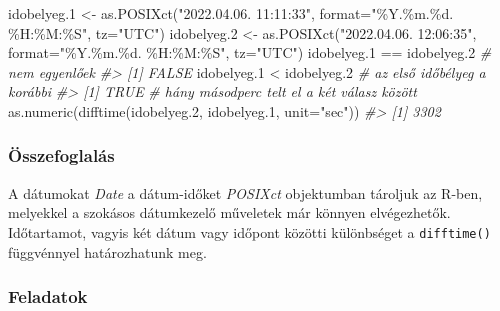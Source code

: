 \documentclass[
]{book}
\makeatletter
\newenvironment{Shaded}{\begin{snugshade}}{\end{snugshade}}
\newcommand{\AttributeTok}[1]{\textcolor[rgb]{0.77,0.63,0.00}{#1}}
\newcommand{\CommentTok}[1]{\textcolor[rgb]{0.56,0.35,0.01}{\textit{#1}}}
\newcommand{\FloatTok}[1]{\textcolor[rgb]{0.00,0.00,0.81}{#1}}
\newcommand{\FunctionTok}[1]{\textcolor[rgb]{0.00,0.00,0.00}{#1}}
\newcommand{\NormalTok}[1]{#1}
\newcommand{\OtherTok}[1]{\textcolor[rgb]{0.56,0.35,0.01}{#1}}
\newcommand{\SpecialCharTok}[1]{\textcolor[rgb]{0.00,0.00,0.00}{#1}}
\newcommand{\StringTok}[1]{\textcolor[rgb]{0.31,0.60,0.02}{#1}}
\newenvironment{kframe}{%
\medskip{}
\setlength{\fboxsep}{.8em}
 \def\at@end@of@kframe{}%
 \ifinner\ifhmode%
  \def\at@end@of@kframe{\end{minipage}}%
  \begin{minipage}{\columnwidth}%
 \fi\fi%
 \def\FrameCommand##1{\hskip\@totalleftmargin \hskip-\fboxsep
 \colorbox{shadecolor}{##1}\hskip-\fboxsep
     \hskip-\linewidth \hskip-\@totalleftmargin \hskip\columnwidth}%
 \MakeFramed {\advance\hsize-\width
   \@totalleftmargin\z@ \linewidth\hsize
   \@setminipage}}%
 {\par\unskip\endMakeFramed%
 \at@end@of@kframe}
\newenvironment{rmdblock}[1]
  {
  \begin{itemize}
  \renewcommand{\labelitemi}{
    \raisebox{-.7\height}[0pt][0pt]{
      {\setkeys{Gin}{width=3em,keepaspectratio}\texttt{[image: images/\#1]}}
    }
  }
  \setlength{\fboxsep}{1em}
  \begin{kframe}
  \item
  }
  {
  \end{kframe}
  \end{itemize}
  }
\newenvironment{rmdsummary}
  {\begin{rmdblock}{summary}}
  {\end{rmdblock}}
\makeatother
\begin{document}
\begin{Shaded}
\begin{Highlighting}[]
\NormalTok{idobelyeg}\FloatTok{.1} \OtherTok{\textless{}{-}} \FunctionTok{as.POSIXct}\NormalTok{(}\StringTok{"2022.04.06. 11:11:33"}\NormalTok{, }
                          \AttributeTok{format=}\StringTok{"\%Y.\%m.\%d. \%H:\%M:\%S"}\NormalTok{, }\AttributeTok{tz=}\StringTok{"UTC"}\NormalTok{)}
\NormalTok{idobelyeg}\FloatTok{.2} \OtherTok{\textless{}{-}} \FunctionTok{as.POSIXct}\NormalTok{(}\StringTok{"2022.04.06. 12:06:35"}\NormalTok{, }
                          \AttributeTok{format=}\StringTok{"\%Y.\%m.\%d. \%H:\%M:\%S"}\NormalTok{, }\AttributeTok{tz=}\StringTok{"UTC"}\NormalTok{)}
\NormalTok{idobelyeg}\FloatTok{.1} \SpecialCharTok{==}\NormalTok{ idobelyeg}\FloatTok{.2}  \CommentTok{\# nem egyenlőek}
\CommentTok{\#\textgreater{} [1] FALSE}
\NormalTok{idobelyeg}\FloatTok{.1} \SpecialCharTok{\textless{}}\NormalTok{ idobelyeg}\FloatTok{.2}   \CommentTok{\# az első időbélyeg a korábbi}
\CommentTok{\#\textgreater{} [1] TRUE}
\CommentTok{\# hány másodperc telt el a két válasz között}
\FunctionTok{as.numeric}\NormalTok{(}\FunctionTok{difftime}\NormalTok{(idobelyeg}\FloatTok{.2}\NormalTok{, idobelyeg}\FloatTok{.1}\NormalTok{, }\AttributeTok{unit=}\StringTok{"sec"}\NormalTok{))}
\CommentTok{\#\textgreater{} [1] 3302}
\end{Highlighting}
\end{Shaded}

\hypertarget{az-r-nyelv-12-summary}{%
\subsubsection{Összefoglalás}\label{az-r-nyelv-12-summary}}

\begin{rmdsummary}
A dátumokat \emph{Date} a dátum-időket \emph{POSIXct} objektumban
tároljuk az R-ben, melyekkel a szokásos dátumkezelő műveletek már
könnyen elvégezhetők. Időtartamot, vagyis két dátum vagy időpont közötti
különbséget a \texttt{difftime()} függvénnyel határozhatunk meg.
\end{rmdsummary}

\hypertarget{az-r-nyelv-12-exercise}{%
\subsubsection{Feladatok}\label{az-r-nyelv-12-exercise}}
\end{document}
